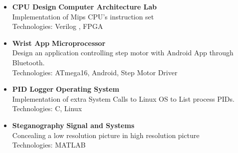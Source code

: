\documentclass[a4paper,10pt]{article} %
\begin{document}
\begin{itemize}
\begin{itemize}
		\item
			\textbf{CPU Design} \hfill \textbf {Computer Architecture Lab} \\
			Implementation of Mips CPU's instruction set \\
			Technologies: Verilog , FPGA
			
		\item
			\textbf {Wrist App} \hfill \textbf {Microprocessor} \\
			Design an application controlling step motor with Android App through Bluetooth.\\
			Technologies: ATmega16, Android, Step Motor Driver
		
		\item
			\textbf {PID Logger} \hfill \textbf {Operating System} \\
			Implementation of extra System Calls to Linux OS to List process PIDs. \\
			Technologies: C, Linux
				
		\item
			\textbf{Steganography} \hfill \textbf {Signal and Systems} \\
			Concealing a low resolution picture in high resolution picture \\
			Technologies: MATLAB
			
		
	\end{itemize}

	
\end{itemize}
\end{document}
